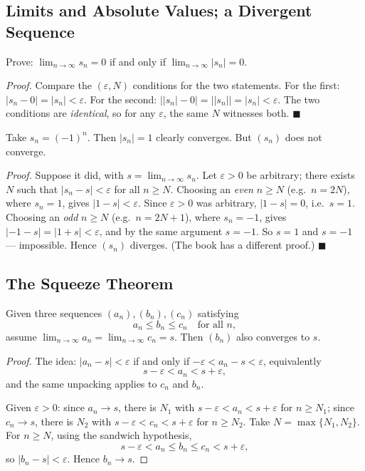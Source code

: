 \documentclass[11pt]{report}
\begin{document}
\subsection{Limits and Absolute Values; a Divergent Sequence}

\begin{exbox}[$s_n \to 0 \iff |s_n| \to 0$]
Prove: $\lim_{n\to\infty} s_n = 0$ if and only if $\lim_{n\to\infty} |s_n| = 0$.

\emph{Proof.} Compare the $(\varepsilon, N)$ conditions for the two statements. For the first: $|s_n - 0| = |s_n| < \varepsilon$. For the second: $\big| |s_n| - 0 \big| = \big| |s_n| \big| = |s_n| < \varepsilon$. The two conditions are \emph{identical}, so for any $\varepsilon$, the same $N$ witnesses both. \hfill $\blacksquare$
\end{exbox}

\begin{exbox}
Take $s_n = (-1)^n$. Then $|s_n| = 1$ clearly converges. But $(s_n)$ does not converge.

\emph{Proof.} Suppose it did, with $s = \lim_{n\to\infty} s_n$. Let $\varepsilon > 0$ be arbitrary; there exists $N$ such that $|s_n - s| < \varepsilon$ for all $n \geq N$. Choosing an \emph{even} $n \geq N$ (e.g.\ $n = 2N$), where $s_n = 1$, gives $|1 - s| < \varepsilon$. Since $\varepsilon > 0$ was arbitrary, $|1 - s| = 0$, i.e.\ $s = 1$. Choosing an \emph{odd} $n \geq N$ (e.g.\ $n = 2N+1$), where $s_n = -1$, gives $|-1 - s| = |1 + s| < \varepsilon$, and by the same argument $s = -1$. So $s = 1$ and $s = -1$ --- impossible. Hence $(s_n)$ diverges. (The book has a different proof.) \hfill $\blacksquare$
\end{exbox}

\subsection{The Squeeze Theorem}

\begin{thmbox}
Given three sequences $(a_n), (b_n), (c_n)$ satisfying
\[
a_n \leq b_n \leq c_n \quad \text{for all } n,
\]
assume $\lim_{n\to\infty} a_n = \lim_{n\to\infty} c_n = s$. Then $(b_n)$ also converges to $s$.
\end{thmbox}

\begin{proof}
The idea: $|a_n - s| < \varepsilon$ if and only if $-\varepsilon < a_n - s < \varepsilon$, equivalently
\[
s - \varepsilon < a_n < s + \varepsilon,
\]
and the same unpacking applies to $c_n$ and $b_n$.

Given $\varepsilon > 0$: since $a_n \to s$, there is $N_1$ with $s - \varepsilon < a_n < s + \varepsilon$ for $n \geq N_1$; since $c_n \to s$, there is $N_2$ with $s - \varepsilon < c_n < s + \varepsilon$ for $n \geq N_2$. Take $N = \max\{N_1, N_2\}$. For $n \geq N$, using the sandwich hypothesis,
\[
s - \varepsilon < a_n \leq b_n \leq c_n < s + \varepsilon,
\]
so $|b_n - s| < \varepsilon$. Hence $b_n \to s$.
\end{proof}
\end{document}
